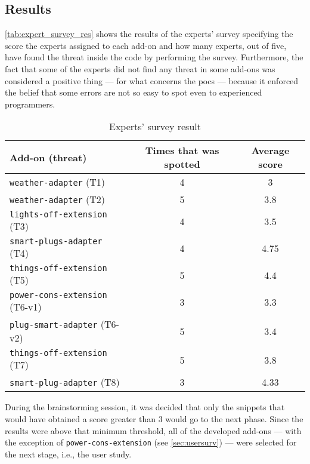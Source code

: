 \subsection{Results}
\label{sec:expert_surv_res}

\autoref{tab:expert_survey_res}  shows the results of the experts' survey specifying the score the experts assigned to each add-on and how many experts, out of five, have found the threat inside the code by performing the survey. Furthermore, the fact that some of the experts did not find any threat in some add-ons was considered a positive thing --- for what concerns the \glspl{poc} --- because it enforced the belief that some errors are not so easy to spot even to experienced programmers.

\begin{table}[h!]
    \centering
    \begin{tabular}{| l | c | c |}
     \hline
     \textbf{Add-on (threat)} & \textbf{Times that was spotted} & \textbf{Average score} \\
     \hline
     \texttt{weather-adapter} (T1) & 4  &  3 \\
     \hline
     \texttt{weather-adapter} (T2) & 5 & 3.8 \\
     \hline
     \texttt{lights-off-extension} (T3) & 4 & 3.5 \\
     \hline
     \texttt{smart-plugs-adapter} (T4) & 4 & 4.75 \\
     \hline
     \texttt{things-off-extension} (T5) & 5 & 4.4 \\
     \hline
     \texttt{power-cons-extension} (T6-v1) & 3 & 3.3 \\
     \hline
     \texttt{plug-smart-adapter} (T6-v2) & 5 & 3.4 \\
     \hline
     \texttt{things-off-extension} (T7) & 5 & 3.8 \\
     \hline
     \texttt{smart-plug-adapter} (T8) & 3 & 4.33 \\
    \hline
    \end{tabular}
    \caption{Experts' survey result}
    \label{tab:expert_survey_res}
\end{table}

During the brainstorming session, it was decided that only the snippets that would have obtained a score greater than $3$ would go to the next phase. Since the results were above that minimum threshold, all of the developed add-ons --- with the exception of \texttt{power-cons-extension} (see \autoref{sec:usersurv}) ---  were selected for the next stage, i.e., the user study.


